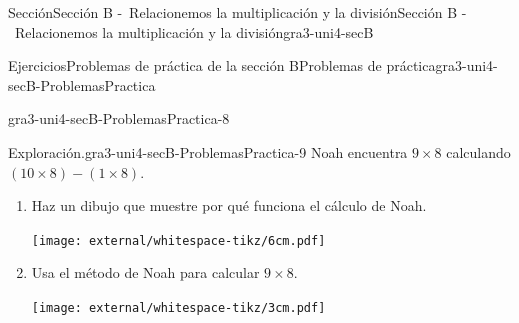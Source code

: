 \begin{sectionptx}{Sección}{Sección B -~Relacionemos la multiplicación y la división}{}{Sección B -~Relacionemos la multiplicación y la división}{}{}{gra3-uni4-secB}
\begin{exercises-subsection}{Ejercicios}{Problemas de práctica de la sección B}{}{Problemas de práctica}{}{}{gra3-uni4-secB-ProblemasPractica}
\begin{divisionexercise}{6}{}{}{gra3-uni4-secB-ProblemasPractica-8}
\begin{sidebyside}{2}{0}{0}{0}
\begin{sbspanel}{0.4}
\end{sbspanel}%
\end{sidebyside}%
\end{divisionexercise}%
\clearpage
\begin{divisionexercise}{7}{Exploración.}{}{gra3-uni4-secB-ProblemasPractica-9}%
Noah encuentra \(9 \times 8\) calculando \((10 \times 8) - (1 \times 8)\).%
%
\begin{enumerate}[label={(\alph*)}]
\item{}Haz un dibujo que muestre por qué funciona el cálculo de Noah.%
\begin{image}{0}{1}{0}{}%
\texttt{[image: external/whitespace-tikz/6cm.pdf]}
\end{image}%
\item{}Usa el método de Noah para calcular \(9\times 8\).%
\begin{image}{0}{1}{0}{}%
\texttt{[image: external/whitespace-tikz/3cm.pdf]}
\end{image}%
\end{enumerate}
\end{divisionexercise}%
\end{exercises-subsection}
\end{sectionptx}
%
%
\typeout{************************************************}
\typeout{************************************************}
%
